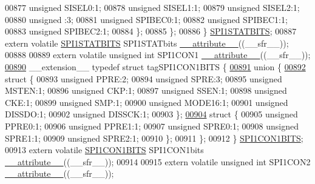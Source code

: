 \begin{DoxyCode}
00877       \textcolor{keywordtype}{unsigned} SISEL0:1;
00878       \textcolor{keywordtype}{unsigned} SISEL1:1;
00879       \textcolor{keywordtype}{unsigned} SISEL2:1;
00880       \textcolor{keywordtype}{unsigned} :3;
00881       \textcolor{keywordtype}{unsigned} SPIBEC0:1;
00882       \textcolor{keywordtype}{unsigned} SPIBEC1:1;
00883       \textcolor{keywordtype}{unsigned} SPIBEC2:1;
00884     \};
00885   \};
00886 \} \hyperlink{a00014_d8/d20/a00768}{SPI1STATBITS};
00887 \textcolor{keyword}{extern} \textcolor{keyword}{volatile} \hyperlink{a00014_d8/d20/a00768}{SPI1STATBITS} SPI1STATbits \hyperlink{a00015_a493c46f03454991ccc5aa7a6e1dfb2a7}{\_\_attribute\_\_}((\_\_sfr\_\_));
00888 
00889 \textcolor{keyword}{extern} \textcolor{keyword}{volatile} \textcolor{keywordtype}{unsigned} \textcolor{keywordtype}{int}  SPI1CON1 \hyperlink{a00015_a493c46f03454991ccc5aa7a6e1dfb2a7}{\_\_attribute\_\_}((\_\_sfr\_\_));
\hypertarget{a00015_source_l00890}{}\hyperlink{a00014}{00890} \_\_extension\_\_ \textcolor{keyword}{typedef} \textcolor{keyword}{struct }tagSPI1CON1BITS \{
\hypertarget{a00015_source_l00891}{}\hyperlink{a00015}{00891}   \textcolor{keyword}{union }\{
\hypertarget{a00015_source_l00892}{}\hyperlink{a00015}{00892}     \textcolor{keyword}{struct }\{
00893       \textcolor{keywordtype}{unsigned} PPRE:2;
00894       \textcolor{keywordtype}{unsigned} SPRE:3;
00895       \textcolor{keywordtype}{unsigned} MSTEN:1;
00896       \textcolor{keywordtype}{unsigned} CKP:1;
00897       \textcolor{keywordtype}{unsigned} SSEN:1;
00898       \textcolor{keywordtype}{unsigned} CKE:1;
00899       \textcolor{keywordtype}{unsigned} SMP:1;
00900       \textcolor{keywordtype}{unsigned} MODE16:1;
00901       \textcolor{keywordtype}{unsigned} DISSDO:1;
00902       \textcolor{keywordtype}{unsigned} DISSCK:1;
00903     \};
\hypertarget{a00015_source_l00904}{}\hyperlink{a00015}{00904}     \textcolor{keyword}{struct }\{
00905       \textcolor{keywordtype}{unsigned} PPRE0:1;
00906       \textcolor{keywordtype}{unsigned} PPRE1:1;
00907       \textcolor{keywordtype}{unsigned} SPRE0:1;
00908       \textcolor{keywordtype}{unsigned} SPRE1:1;
00909       \textcolor{keywordtype}{unsigned} SPRE2:1;
00910     \};
00911   \};
00912 \} \hyperlink{a00014_d3/d2c/a00764}{SPI1CON1BITS};
00913 \textcolor{keyword}{extern} \textcolor{keyword}{volatile} \hyperlink{a00014_d3/d2c/a00764}{SPI1CON1BITS} SPI1CON1bits \hyperlink{a00015_a493c46f03454991ccc5aa7a6e1dfb2a7}{\_\_attribute\_\_}((\_\_sfr\_\_));
00914 
00915 \textcolor{keyword}{extern} \textcolor{keyword}{volatile} \textcolor{keywordtype}{unsigned} \textcolor{keywordtype}{int}  SPI1CON2 \hyperlink{a00015_a493c46f03454991ccc5aa7a6e1dfb2a7}{\_\_attribute\_\_}((\_\_sfr\_\_));

\end{DoxyCode}
